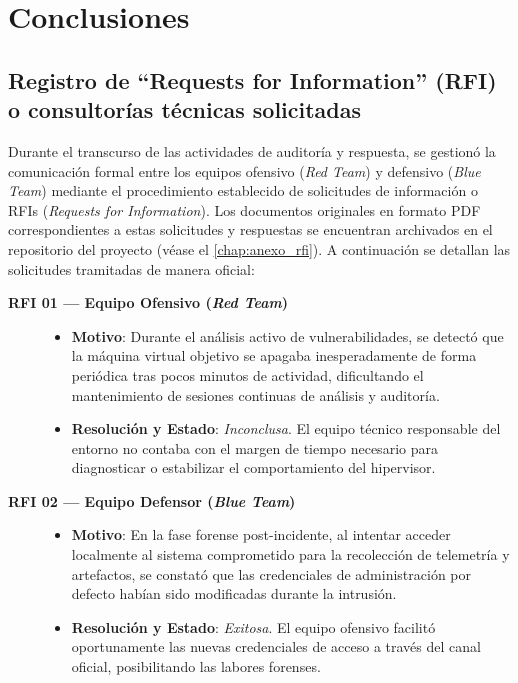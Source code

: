 \chapter[Conclusiones]{Conclusiones}
\label{chap:evaluacion_final_sla}

\section[Registro de RFIs o Consultorías]{Registro de ``Requests for Information'' (RFI) o consultorías técnicas solicitadas}
\label{sec:registro_rfi}
Durante el transcurso de las actividades de auditoría y respuesta, se gestionó la comunicación formal entre los equipos ofensivo (\textit{Red Team}) y defensivo (\textit{Blue Team}) mediante el procedimiento establecido de solicitudes de información o RFIs (\textit{Requests for Information}). Los documentos originales en formato PDF correspondientes a estas solicitudes y respuestas se encuentran archivados en el repositorio del proyecto (véase el \ref{chap:anexo_rfi}). A continuación se detallan las solicitudes tramitadas de manera oficial:

\begin{description}
    \item[\textbf{RFI 01 --- Equipo Ofensivo (\textit{Red Team})}] \hfill
    \begin{itemize}
        \item \textbf{Motivo}: Durante el análisis activo de vulnerabilidades, se detectó que la máquina virtual objetivo se apagaba inesperadamente de forma periódica tras pocos minutos de actividad, dificultando el mantenimiento de sesiones continuas de análisis y auditoría.
        \item \textbf{Resolución y Estado}: \textit{Inconclusa}. El equipo técnico responsable del entorno no contaba con el margen de tiempo necesario para diagnosticar o estabilizar el comportamiento del hipervisor.
    \end{itemize}
    
    \item[\textbf{RFI 02 --- Equipo Defensor (\textit{Blue Team})}] \hfill
    \begin{itemize}
        \item \textbf{Motivo}: En la fase forense post-incidente, al intentar acceder localmente al sistema comprometido para la recolección de telemetría y artefactos, se constató que las credenciales de administración por defecto habían sido modificadas durante la intrusión.
        \item \textbf{Resolución y Estado}: \textit{Exitosa}. El equipo ofensivo facilitó oportunamente las nuevas credenciales de acceso a través del canal oficial, posibilitando las labores forenses.
    \end{itemize}
\end{description}

